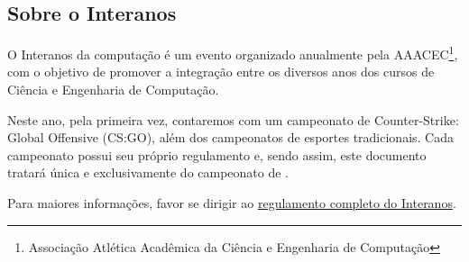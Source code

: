 \subsection{Sobre o Interanos}

O Interanos da computação é um evento organizado anualmente pela AAACEC\footnote{Associação Atlética Acadêmica da Ciência e Engenharia de Computação}, com o objetivo de promover a integração entre os diversos anos dos cursos de Ciência e Engenharia de Computação.

Neste ano, pela primeira vez, contaremos com um campeonato de Counter-Strike: Global Offensive (CS:GO), além dos campeonatos de esportes tradicionais. Cada campeonato possui seu próprio regulamento e, sendo assim, este documento tratará única e exclusivamente do campeonato de \Modality.

Para maiores informações, favor se dirigir ao \href{http://\FullRulesURL}{regulamento completo do Interanos}.